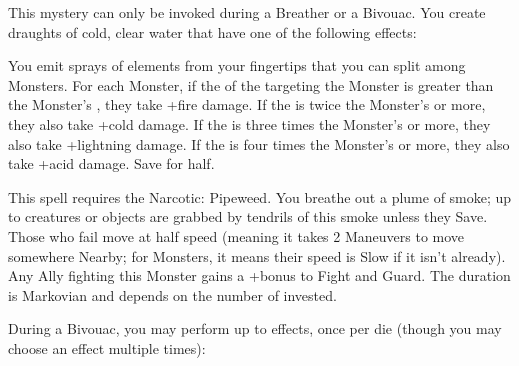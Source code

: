 {\MYSTERY [
  Name = Clearwater,
  Link = arcana-mystery-clearwater,
  Paradigm = Elements,
  Save = n/a,
  Duration = Instant,
  Target = Self or Close Target(s)
]

This mystery can only be invoked during a Breather or a Bivouac.  You create \DICE draughts of cold, clear water that have one of the following effects:


\MYSTERY [
  Name = Elemental Spray,
  Link = arcana-mystery-elemental-spray,
  Paradigm = Elements,
  Save = Y (half),
  Duration = Instant,
  Target = Close or Nearby Target(s)
]

You emit \DICE sprays of elements from your fingertips that you can split among \DICE Monsters.  For each Monster, if the \SUMDICE of the \DICE targeting the Monster is greater than the Monster's \HD, they take \DICE+\DICE fire damage.  If the \SUMDICE is twice the Monster's \HD or more, they also take \DICE+\DICE cold damage.  If the \SUMDICE is three times the Monster's \HD or more, they also take \DICE+\DICE lightning damage.  If the \SUMDICE is four times the Monster's \HD or more, they also take \DICE+\DICE acid damage.  Save for half.

\MYSTERY [
  Name = Entangling Smoke ,
  Link = arcana-mystery-entangling-smoke,
  Paradigm = Elements,
  Save = Y (neg.),
  Duration = Markovian,
  Target = Close or Nearby Target(s)
]

This spell requires the Narcotic: Pipeweed.  You breathe out a plume of smoke; up to \DICE creatures or objects are grabbed by tendrils of this smoke unless they Save.  Those who fail move at half speed (meaning it takes 2 Maneuvers to move somewhere Nearby; for Monsters, it means their speed is Slow if it isn't already).  Any Ally fighting this Monster gains a +\DICE bonus to Fight and Guard. The duration is Markovian and depends on the number of \DICE invested.

\MYSTERY [
  Name = Hearthfire,
  Link = arcana-mystery-hearthfire,
  Paradigm = Elements,
  Save = n/a,
  Duration = Bivouac,
  Target = Close Target(s)
]

During a Bivouac, you may perform up to \DICE effects, once per die (though you may choose an effect multiple times):

}
